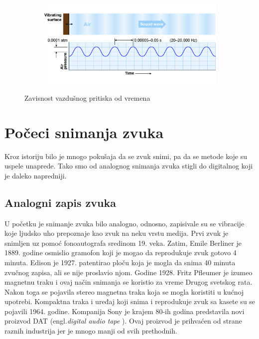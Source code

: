 \documentclass[a4paper]{article}
\begin{document}
  \begin{figure}[h]
        \centering
        
        \begin{subfigure}[t]{0.49\textwidth}
            \centering
            \includegraphics[width=1\textwidth]{airpressure}
        \end{subfigure}
        \caption{Zavisnost vazdušnog pritiska od vremena}
        \label{fig:slika1}
    \end{figure}
  
    \section{Počeci snimanja zvuka}
    Kroz istoriju bilo je mnogo pokušaja da se zvuk snimi, pa da se metode koje su uspele unaprede. Tako smo od analognog snimanja zvuka stigli do digitalnog koji je daleko napredniji. 
    
    \subsection {Analogni zapis zvuka}
    U početku je snimanje zvuka bilo analogno, odnosno, zapisivale su se vibracije koje ljudsko uho prepoznaje kao zvuk na neku vrstu medija. 
    Prvi zvuk je snimljen uz pomoć fonoautografa sredinom 19. veka. Zatim, Emile Berliner je 1889. godine osmislio gramofon koji je mogao da reprodukuje zvuk gotovo 4 minuta. Edison je 1927. patentirao ploču
    koja je mogla da snima 40 minuta zvučnog zapisa, ali se nije proslavio njom. Godine 1928. Fritz Pfleumer je izumeo magnetnu traku i ovaj način snimanja se koristio za vreme Drugog svetskog rata. Nakon toga se pojavila
    stereo magnetna traka koja se mogla koristiti u kućnoj upotrebi. Kompaktna traka i uređaj koji snima i reprodukuje zvuk sa kasete su se pojavili 1964. godine. Kompanija Sony je krajem 80-ih godina predstavila
    novi proizvod DAT (engl.\textit {digital audio tape} ). Ovaj proizvod je prihvaćen od strane raznih industrija jer je mnogo manji od svih prethodnih.
\end{document}
